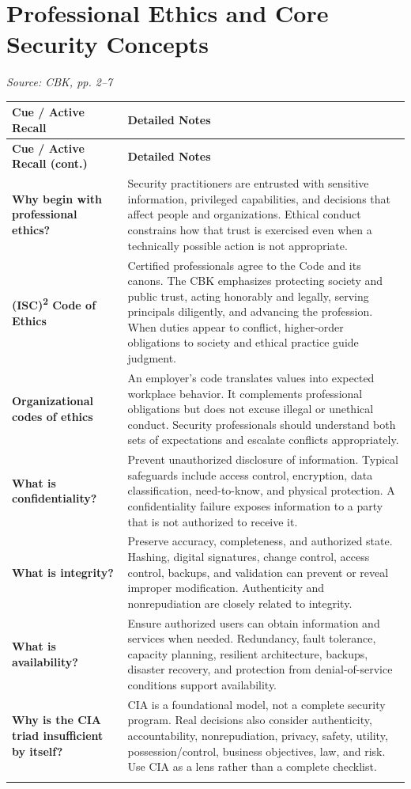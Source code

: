 \documentclass[10pt,letterpaper]{article}
\makeatletter
\newenvironment{cornell}
{\rowcolors{2}{white}{notebg}\begin{longtable}{@{}>{\raggedright\arraybackslash\columncolor{cuebg}\color{navy}\bfseries}p{0.285\textwidth}>{\raggedright\arraybackslash}p{0.65\textwidth}@{}}
\rowcolor{navy}\color{white}\textbf{Cue / Active Recall} & \color{white}\textbf{Detailed Notes}\\ \hline
\endfirsthead
\rowcolor{navy}\color{white}\textbf{Cue / Active Recall (cont.)} & \color{white}\textbf{Detailed Notes}\\ \hline
\endhead}
{\end{longtable}}
\newcommand{\noterow}[2]{#1 & #2\\\arrayrulecolor{line}\hline}
\newcommand{\source}[1]{\par{\footnotesize\color{teal}\textit{Source: CBK, #1}}\par}
\makeatother
\begin{document}
\section{\color{navy}Professional Ethics and Core Security Concepts}
\source{pp. 2--7}
\begin{cornell}
\noterow{Why begin with professional ethics?}{Security practitioners are entrusted with sensitive information, privileged capabilities, and decisions that affect people and organizations. Ethical conduct constrains how that trust is exercised even when a technically possible action is not appropriate.}
\noterow{(ISC)\textsuperscript{2} Code of Ethics}{Certified professionals agree to the Code and its canons. The CBK emphasizes protecting society and public trust, acting honorably and legally, serving principals diligently, and advancing the profession. When duties appear to conflict, higher-order obligations to society and ethical practice guide judgment.}
\noterow{Organizational codes of ethics}{An employer's code translates values into expected workplace behavior. It complements professional obligations but does not excuse illegal or unethical conduct. Security professionals should understand both sets of expectations and escalate conflicts appropriately.}
\noterow{What is confidentiality?}{Prevent unauthorized disclosure of information. Typical safeguards include access control, encryption, data classification, need-to-know, and physical protection. A confidentiality failure exposes information to a party that is not authorized to receive it.}
\noterow{What is integrity?}{Preserve accuracy, completeness, and authorized state. Hashing, digital signatures, change control, access control, backups, and validation can prevent or reveal improper modification. Authenticity and nonrepudiation are closely related to integrity.}
\noterow{What is availability?}{Ensure authorized users can obtain information and services when needed. Redundancy, fault tolerance, capacity planning, resilient architecture, backups, disaster recovery, and protection from denial-of-service conditions support availability.}
\noterow{Why is the CIA triad insufficient by itself?}{CIA is a foundational model, not a complete security program. Real decisions also consider authenticity, accountability, nonrepudiation, privacy, safety, utility, possession/control, business objectives, law, and risk. Use CIA as a lens rather than a complete checklist.}
\end{cornell}
\end{document}
